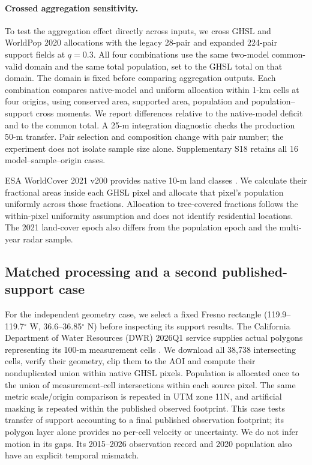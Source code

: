\documentclass[pdflatex,sn-nature]{sn-jnl}
\begin{document}
\paragraph{Crossed aggregation sensitivity.} To test the aggregation effect directly across inputs, we cross GHSL and WorldPop 2020 allocations with the legacy 28-pair and expanded 224-pair support fields at $q=0.3$. All four combinations use the same two-model common-valid domain and the same total population, set to the GHSL total on that domain. The domain is fixed before comparing aggregation outputs. Each combination compares native-model and uniform allocation within 1-km cells at four origins, using conserved area, supported area, population and population--support cross moments. We report differences relative to the native-model deficit and to the common total. A 25-m integration diagnostic checks the production 50-m transfer. Pair selection and composition change with pair number; the experiment does not isolate sample size alone. Supplementary S18 retains all 16 model--sample--origin cases.

ESA WorldCover 2021 v200 provides native 10-m land classes \citep{worldcover2021}. We calculate their fractional areas inside each GHSL pixel and allocate that pixel's population uniformly across those fractions. Allocation to tree-covered fractions follows the within-pixel uniformity assumption and does not identify residential locations. The 2021 land-cover epoch also differs from the population epoch and the multi-year radar sample.

\subsection{Matched processing and a second published-support case}


For the independent geometry case, we select a fixed Fresno rectangle (119.9--119.7$^\circ$ W, 36.6--36.85$^\circ$ N) before inspecting its support results. The California Department of Water Resources (DWR) 2026Q1 service supplies actual polygons representing its 100-m measurement cells \citep{dwr2026,dwrdocumentation}. We download all 38,738 intersecting cells, verify their geometry, clip them to the AOI and compute their nonduplicated union within native GHSL pixels. Population is allocated once to the union of measurement-cell intersections within each source pixel. The same metric scale/origin comparison is repeated in UTM zone 11N, and artificial masking is repeated within the published observed footprint. This case tests transfer of support accounting to a final published observation footprint; its polygon layer alone provides no per-cell velocity or uncertainty. We do not infer motion in its gaps. Its 2015--2026 observation record and 2020 population also have an explicit temporal mismatch.
\end{document}
